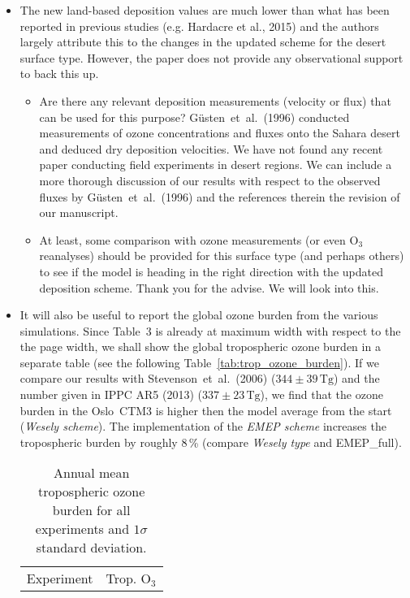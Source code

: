 \documentclass{scrartcl}
\begin{document}
\begin{itemize}
\begin{itemize}
  \item {\color{blue}  The new land-based deposition values are much lower than what has
    been reported in previous studies (e.g. Hardacre et al., 2015) and the authors largely
    attribute this to the changes in the updated scheme for the desert surface type. However,
    the paper does not provide any observational support to back this up. }
    \begin{itemize}
    \item {\color{blue}  Are there any relevant deposition measurements (velocity or flux) that can be used for this purpose?}
      G\"{u}sten~et~al.~(1996) conducted measurements of ozone concentrations
      and fluxes onto the Sahara desert and deduced dry deposition velocities.
      We have not found any recent paper conducting field experiments in desert regions. We can include a more
      thorough discussion of our results with respect to the observed fluxes by G\"{u}sten~et~al.~(1996) and the
      references therein the revision of our manuscript. 
    \item {\color{blue}  At least, some comparison with ozone measurements (or even $\mathrm{O_3}$ reanalyses)
      should be provided for this surface type (and perhaps others) to see if the model is
      heading in the right direction with the updated deposition scheme.}
      Thank you for the advise. We will look into this.
    \end{itemize}
  \item {\color{blue}  It will also be useful to report the global ozone burden from the various
    simulations.}
    Since Table~3 is already at maximum width with respect to the the page width, we shall show the global
    tropospheric ozone burden in a separate table (see the following Table~\ref{tab:trop_ozone_burden}). If we compare our results
    with Stevenson~et~al.~(2006)
    ($344\pm 39\,\mathrm{Tg}$) and the number given in IPPC AR5 (2013) ($337\pm 23\,\mathrm{Tg}$), we find
    that the ozone burden in the Oslo~CTM3 is higher then the model average from the start (\emph{Wesely scheme}).
    The implementation of the \emph{EMEP scheme}
    increases the tropospheric burden by roughly 8\,\% (compare \emph{Wesely type} and EMEP\_full).
    \begin{table*}[h]
        \caption{Annual mean tropospheric ozone burden for all experiments and $1 \sigma$ standard deviation.}
        \centering
        \begin{tabular}{lrcl}
          \hline
          Experiment & \multicolumn{3}{c}{Trop. $\mathrm{O_3}$}\\

\end{tabular}
\end{table*}
\end{itemize}
\end{itemize}
\end{document}
